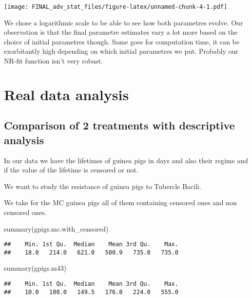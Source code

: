 \documentclass[
]{article}
\newenvironment{Shaded}{\begin{snugshade}}{\end{snugshade}}
\newcommand{\FunctionTok}[1]{\textcolor[rgb]{0.00,0.00,0.00}{#1}}
\newcommand{\NormalTok}[1]{#1}
\begin{document}
\texttt{[image: FINAL\_adv\_stat\_files/figure-latex/unnamed-chunk-4-1.pdf]}

We chose a logarithmic scale to be able to see how both parametres
evolve. Our observation is that the final parametre estimates vary a lot
more based on the choice of initial parametres though. Same goes for
computation time, it can be exorbitantly high depending on which initial
parametres we put. Probably our NR-fit function isn't very robust.

\hypertarget{real-data-analysis}{%
\section{Real data analysis}\label{real-data-analysis}}

\hypertarget{comparison-of-2-treatments-with-descriptive-analysis}{%
\subsection{Comparison of 2 treatments with descriptive
analysis}\label{comparison-of-2-treatments-with-descriptive-analysis}}

In our data we have the lifetimes of guinea pigs in days and also their
regime and if the value of the lifetime is censored or not.

We want to study the resistance of guinea pigs to Tubercle Bacili.

We take for the MC guinea pigs all of them containing censored ones and
non censored ones.

\begin{Shaded}
\begin{Highlighting}[]
\FunctionTok{summary}\NormalTok{(gpigs.mc.with\_censored)}
\end{Highlighting}
\end{Shaded}

\begin{verbatim}
##    Min. 1st Qu.  Median    Mean 3rd Qu.    Max. 
##    18.0   214.0   621.0   500.9   735.0   735.0
\end{verbatim}

\begin{Shaded}
\begin{Highlighting}[]
\FunctionTok{summary}\NormalTok{(gpigs.m43)}
\end{Highlighting}
\end{Shaded}

\begin{verbatim}
##    Min. 1st Qu.  Median    Mean 3rd Qu.    Max. 
##    10.0   108.0   149.5   176.8   224.0   555.0
\end{verbatim}
\end{document}
